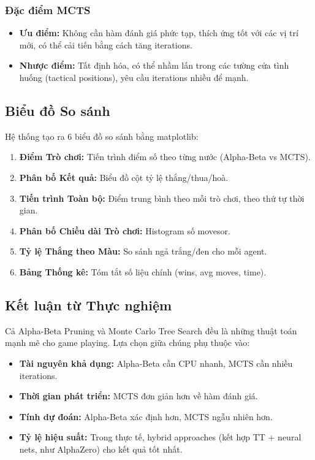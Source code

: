 \subsubsection{Đặc điểm MCTS}
\begin{itemize}
    \item \textbf{Ưu điểm:} Không cần hàm đánh giá phức tạp, thích ứng tốt với các vị trí mới, có thể cải tiến bằng cách tăng iterations.
    \item \textbf{Nhược điểm:} Tất định hóa, có thể nhầm lấn trong các tường cửa tình huống (tactical positions), yêu cầu iterations nhiều để mạnh.
\end{itemize}

\subsection{Biểu đồ So sánh}

Hệ thống tạo ra 6 biểu đồ so sánh bằng matplotlib:
\begin{enumerate}
    \item \textbf{Điểm Trò chơi:} Tiến trình điểm số theo từng nước (Alpha-Beta vs MCTS).
    \item \textbf{Phân bố Kết quả:} Biểu đồ cột tỷ lệ thắng/thua/hoà.
    \item \textbf{Tiến trình Toàn bộ:} Điểm trung bình theo mỗi trò chơi, theo thứ tự thời gian.
    \item \textbf{Phân bố Chiều dài Trò chơi:} Histogram số movesor.
    \item \textbf{Tỷ lệ Thắng theo Màu:} So sánh ngả trắng/đen cho mỗi agent.
    \item \textbf{Bảng Thống kê:} Tóm tắt số liệu chính (wins, avg moves, time).
\end{enumerate}

\subsection{Kết luận từ Thực nghiệm}
Cả Alpha-Beta Pruning và Monte Carlo Tree Search đều là những thuật toán mạnh mẽ cho game playing. Lựa chọn giữa chúng phụ thuộc vào:
\begin{itemize}
    \item \textbf{Tài nguyên khả dụng:} Alpha-Beta cần CPU nhanh, MCTS cần nhiều iterations.
    \item \textbf{Thời gian phát triển:} MCTS đơn giản hơn về hàm đánh giá.
    \item \textbf{Tính dự đoán:} Alpha-Beta xác định hơn, MCTS ngẫu nhiên hơn.
    \item \textbf{Tỷ lệ hiệu suất:} Trong thực tế, hybrid approaches (kết hợp TT + neural nets, như AlphaZero) cho kết quả tốt nhất.
\end{itemize}

